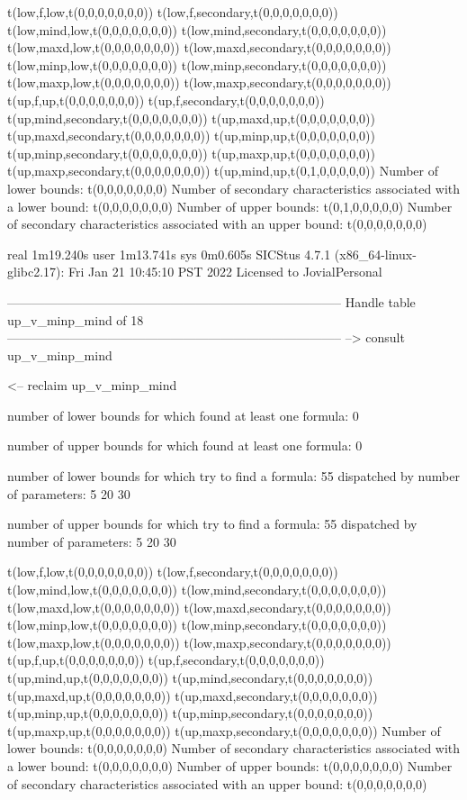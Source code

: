 t(low,f,low,t(0,0,0,0,0,0,0))
t(low,f,secondary,t(0,0,0,0,0,0,0))
t(low,mind,low,t(0,0,0,0,0,0,0))
t(low,mind,secondary,t(0,0,0,0,0,0,0))
t(low,maxd,low,t(0,0,0,0,0,0,0))
t(low,maxd,secondary,t(0,0,0,0,0,0,0))
t(low,minp,low,t(0,0,0,0,0,0,0))
t(low,minp,secondary,t(0,0,0,0,0,0,0))
t(low,maxp,low,t(0,0,0,0,0,0,0))
t(low,maxp,secondary,t(0,0,0,0,0,0,0))
t(up,f,up,t(0,0,0,0,0,0,0))
t(up,f,secondary,t(0,0,0,0,0,0,0))
t(up,mind,secondary,t(0,0,0,0,0,0,0))
t(up,maxd,up,t(0,0,0,0,0,0,0))
t(up,maxd,secondary,t(0,0,0,0,0,0,0))
t(up,minp,up,t(0,0,0,0,0,0,0))
t(up,minp,secondary,t(0,0,0,0,0,0,0))
t(up,maxp,up,t(0,0,0,0,0,0,0))
t(up,maxp,secondary,t(0,0,0,0,0,0,0))
t(up,mind,up,t(0,1,0,0,0,0,0))
Number of lower bounds:                                             t(0,0,0,0,0,0,0)
Number of secondary characteristics associated with a lower bound:  t(0,0,0,0,0,0,0)
Number of upper bounds:                                             t(0,1,0,0,0,0,0)
Number of secondary characteristics associated with an upper bound: t(0,0,0,0,0,0,0)

real	1m19.240s
user	1m13.741s
sys	0m0.605s
SICStus 4.7.1 (x86_64-linux-glibc2.17): Fri Jan 21 10:45:10 PST 2022
Licensed to JovialPersonal


--------------------------------------------------------------------------------
Handle table up_v_minp_mind of 18
--------------------------------------------------------------------------------
--> consult up_v_minp_mind

<-- reclaim up_v_minp_mind

number of lower bounds for which found at least one formula: 0

number of upper bounds for which found at least one formula: 0

number of lower bounds for which try to find a formula: 55
dispatched by number of parameters: 5  20  30

number of upper bounds for which try to find a formula: 55
dispatched by number of parameters: 5  20  30

t(low,f,low,t(0,0,0,0,0,0,0))
t(low,f,secondary,t(0,0,0,0,0,0,0))
t(low,mind,low,t(0,0,0,0,0,0,0))
t(low,mind,secondary,t(0,0,0,0,0,0,0))
t(low,maxd,low,t(0,0,0,0,0,0,0))
t(low,maxd,secondary,t(0,0,0,0,0,0,0))
t(low,minp,low,t(0,0,0,0,0,0,0))
t(low,minp,secondary,t(0,0,0,0,0,0,0))
t(low,maxp,low,t(0,0,0,0,0,0,0))
t(low,maxp,secondary,t(0,0,0,0,0,0,0))
t(up,f,up,t(0,0,0,0,0,0,0))
t(up,f,secondary,t(0,0,0,0,0,0,0))
t(up,mind,up,t(0,0,0,0,0,0,0))
t(up,mind,secondary,t(0,0,0,0,0,0,0))
t(up,maxd,up,t(0,0,0,0,0,0,0))
t(up,maxd,secondary,t(0,0,0,0,0,0,0))
t(up,minp,up,t(0,0,0,0,0,0,0))
t(up,minp,secondary,t(0,0,0,0,0,0,0))
t(up,maxp,up,t(0,0,0,0,0,0,0))
t(up,maxp,secondary,t(0,0,0,0,0,0,0))
Number of lower bounds:                                             t(0,0,0,0,0,0,0)
Number of secondary characteristics associated with a lower bound:  t(0,0,0,0,0,0,0)
Number of upper bounds:                                             t(0,0,0,0,0,0,0)
Number of secondary characteristics associated with an upper bound: t(0,0,0,0,0,0,0)

